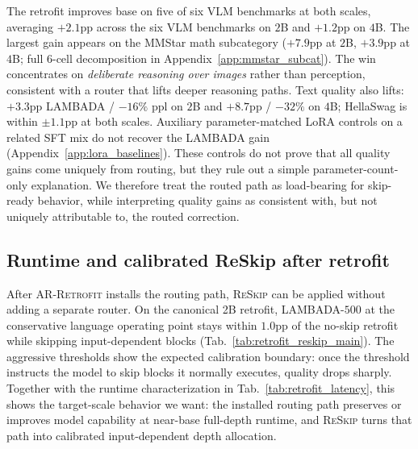 \documentclass{article}
\newcommand{\reskip}{\textsc{ReSkip}}
\newcommand{\retrofit}{\textsc{AR-Retrofit}}
\begin{document}
The retrofit improves base on five of six VLM benchmarks at both scales, averaging $+2.1$pp across the six VLM benchmarks on $2$B and $+1.2$pp on $4$B. The largest gain appears on the MMStar math subcategory ($+7.9$pp at $2$B, $+3.9$pp at $4$B; full $6$-cell decomposition in Appendix~\ref{app:mmstar_subcat}). The win concentrates on \emph{deliberate reasoning over images} rather than perception, consistent with a router that lifts deeper reasoning paths. Text quality also lifts: $+3.3$pp LAMBADA / $-16\%$ ppl on $2$B and $+8.7$pp / $-32\%$ on $4$B; HellaSwag is within $\pm 1.1$pp at both scales. Auxiliary parameter-matched LoRA controls on a related SFT mix do not recover the LAMBADA gain (Appendix~\ref{app:lora_baselines}). These controls do not prove that all quality gains come uniquely from routing, but they rule out a simple parameter-count-only explanation. We therefore treat the routed path as load-bearing for skip-ready behavior, while interpreting quality gains as consistent with, but not uniquely attributable to, the routed correction.

\subsection{Runtime and calibrated ReSkip after retrofit}
\label{sec:exp_reskip_tradeoff}

After \retrofit{} installs the routing path, \reskip{} can be applied without adding a separate router. On the canonical 2B retrofit, LAMBADA-$500$ at the conservative language operating point stays within $1.0$pp of the no-skip retrofit while skipping input-dependent blocks (Tab.~\ref{tab:retrofit_reskip_main}). The aggressive thresholds show the expected calibration boundary: once the threshold instructs the model to skip blocks it normally executes, quality drops sharply. Together with the runtime characterization in Tab.~\ref{tab:retrofit_latency}, this shows the target-scale behavior we want: the installed routing path preserves or improves model capability at near-base full-depth runtime, and \reskip{} turns that path into calibrated input-dependent depth allocation.
\end{document}
